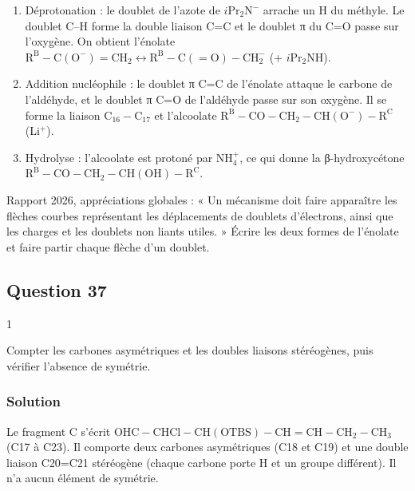 \documentclass[11pt,a4paper]{article}
\providecommand{\tightlist}{\setlength{\itemsep}{0pt}\setlength{\parskip}{0pt}}
\begin{document}
\begin{enumerate}
\def\labelenumi{\arabic{enumi}.}
\tightlist
\item
  Déprotonation : le doublet de l'azote de \(i\mathrm{Pr_2N^-}\) arrache un H du méthyle. Le doublet C--H forme la double liaison C=C et le doublet π du C=O passe sur l'oxygène. On obtient l'énolate \(\mathrm{R^B{-}C(O^-){=}CH_2}\leftrightarrow\mathrm{R^B{-}C(=O){-}CH_2^-}\) (+ \(i\mathrm{Pr_2NH}\)).
\item
  Addition nucléophile : le doublet π C=C de l'énolate attaque le carbone de l'aldéhyde, et le doublet π C=O de l'aldéhyde passe sur son oxygène. Il se forme la liaison \(\mathrm{C_{16}{-}C_{17}}\) et l'alcoolate \(\mathrm{R^B{-}CO{-}CH_2{-}CH(O^-){-}R^C}\) (Li\(^+\)).
\item
  Hydrolyse : l'alcoolate est protoné par NH\(_4^+\), ce qui donne la β-hydroxycétone \(\mathrm{R^B{-}CO{-}CH_2{-}CH(OH){-}R^C}\).
\end{enumerate}

\begin{jury}

Rapport 2026, appréciations globales : « Un mécanisme doit faire apparaître les flèches courbes représentant les déplacements de doublets d'électrons, ainsi que les charges et les doublets non liants utiles. » Écrire les deux formes de l'énolate et faire partir chaque flèche d'un doublet.

\end{jury}

\hypertarget{question-37}{%
\subsection{Question 37}\label{question-37}}

\begin{indication}{1}

Compter les carbones asymétriques et les doubles liaisons stéréogènes, puis vérifier l'absence de symétrie.

\end{indication}

\hypertarget{solution-36}{%
\subsubsection{Solution}\label{solution-36}}

Le fragment C s'écrit \(\mathrm{OHC{-}CHCl{-}CH(OTBS){-}CH{=}CH{-}CH_2{-}CH_3}\) (C17 à C23). Il comporte deux carbones asymétriques (C18 et C19) et une double liaison C20=C21 stéréogène (chaque carbone porte H et un groupe différent). Il n'a aucun élément de symétrie.
\end{document}

